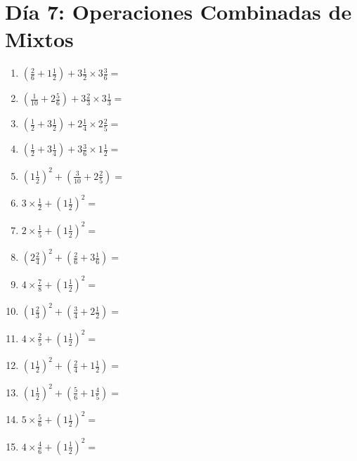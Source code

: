 \documentclass[12pt]{article}
\begin{document}
\section*{Día 7: Operaciones Combinadas de Mixtos}
\begin{enumerate}
\item \large $ (\frac{2}{6} + 1 \frac{1}{2}) + 3 \frac{1}{2} \times 3 \frac{3}{6} = $ \vspace{1.8cm}
\item \large $ (\frac{1}{10} + 2 \frac{5}{6}) + 3 \frac{2}{3} \times 3 \frac{1}{3} = $ \vspace{1.8cm}
\item \large $ (\frac{1}{2} + 3 \frac{1}{2}) + 2 \frac{1}{4} \times 2 \frac{2}{5} = $ \vspace{1.8cm}
\item \large $ (\frac{1}{2} + 3 \frac{1}{4}) + 3 \frac{3}{6} \times 1 \frac{1}{2} = $ \vspace{1.8cm}
\item \large $ (1 \frac{1}{2})^2 + (\frac{3}{10} + 2 \frac{2}{5}) = $ \vspace{1.8cm}
\item \large $ 3 \times \frac{1}{2} + (1 \frac{1}{2})^2 = $ \vspace{1.8cm}
\item \large $ 2 \times \frac{1}{5} + (1 \frac{1}{2})^2 = $ \vspace{1.8cm}
\item \large $ (2 \frac{2}{4})^2 + (\frac{2}{6} + 3 \frac{1}{6}) = $ \vspace{1.8cm}
\item \large $ 4 \times \frac{7}{8} + (1 \frac{1}{2})^2 = $ \vspace{1.8cm}
\item \large $ (1 \frac{2}{3})^2 + (\frac{3}{4} + 2 \frac{1}{2}) = $ \vspace{1.8cm}
\newpage
\item \large $ 4 \times \frac{2}{5} + (1 \frac{1}{2})^2 = $ \vspace{1.8cm}
\item \large $ (1 \frac{1}{2})^2 + (\frac{2}{4} + 1 \frac{1}{2}) = $ \vspace{1.8cm}
\item \large $ (1 \frac{1}{2})^2 + (\frac{5}{6} + 1 \frac{4}{5}) = $ \vspace{1.8cm}
\item \large $ 5 \times \frac{5}{6} + (1 \frac{1}{2})^2 = $ \vspace{1.8cm}
\item \large $ 4 \times \frac{4}{6} + (1 \frac{1}{2})^2 = $ \vspace{1.8cm}

\end{enumerate}
\end{document}
